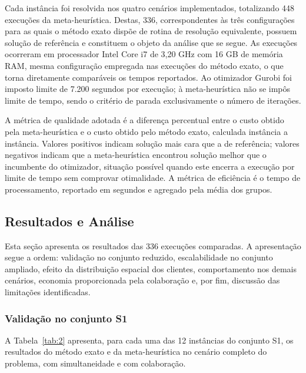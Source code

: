 \documentclass[a4paper,12pt]{article}
\begin{document}
Cada instância foi resolvida nos quatro cenários implementados, totalizando 448 execuções da meta-heurística. Destas, 336, correspondentes às três configurações para as quais o método exato dispõe de rotina de resolução equivalente, possuem solução de referência e constituem o objeto da análise que se segue. As execuções ocorreram em processador Intel Core i7 de 3,20 GHz com 16 GB de memória RAM, mesma configuração empregada nas execuções do método exato, o que torna diretamente comparáveis os tempos reportados. Ao otimizador Gurobi foi imposto limite de 7.200 segundos por execução; à meta-heurística não se impôs limite de tempo, sendo o critério de parada exclusivamente o número de iterações.

A métrica de qualidade adotada é a diferença percentual entre o custo obtido pela meta-heurística e o custo obtido pelo método exato, calculada instância a instância. Valores positivos indicam solução mais cara que a de referência; valores negativos indicam que a meta-heurística encontrou solução melhor que o incumbente do otimizador, situação possível quando este encerra a execução por limite de tempo sem comprovar otimalidade. A métrica de eficiência é o tempo de processamento, reportado em segundos e agregado pela média dos grupos.

\subsection{Resultados e Análise}
\label{sec:resultados}
Esta seção apresenta os resultados das 336 execuções comparadas. A apresentação segue a ordem: validação no conjunto reduzido, escalabilidade no conjunto ampliado, efeito da distribuição espacial dos clientes, comportamento nos demais cenários, economia proporcionada pela colaboração e, por fim, discussão das limitações identificadas.

\subsubsection{Validação no conjunto S1}
A Tabela~\ref{tab:2} apresenta, para cada uma das 12 instâncias do conjunto S1, os resultados do método exato e da meta-heurística no cenário completo do problema, com simultaneidade e com colaboração.
\end{document}
